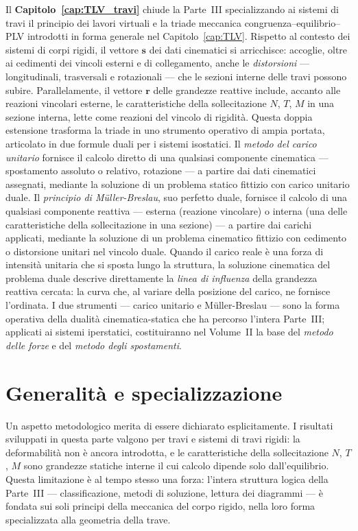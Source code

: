Il \textbf{Capitolo~\ref{cap:TLV_travi}} chiude la Parte~III specializzando ai
sistemi di travi il principio dei lavori virtuali e la triade meccanica
congruenza--equilibrio--PLV introdotti in forma generale nel
Capitolo~\ref{cap:TLV}. Rispetto al contesto dei sistemi di corpi rigidi,
il vettore $\bm{s}$ dei dati cinematici si arricchisce: accoglie, oltre ai
cedimenti dei vincoli esterni e di collegamento, anche le \emph{distorsioni}
--- longitudinali, trasversali e rotazionali --- che le sezioni interne delle
travi possono subire. Parallelamente, il vettore $\bm{r}$ delle grandezze
reattive include, accanto alle reazioni vincolari esterne, le caratteristiche
della sollecitazione $N$, $T$, $M$ in una sezione interna, lette come reazioni
del vincolo di rigidità. Questa doppia estensione trasforma la triade in uno
strumento operativo di ampia portata, articolato in due formule duali per i
sistemi isostatici. Il \emph{metodo del carico unitario} fornisce il calcolo
diretto di una qualsiasi componente cinematica --- spostamento assoluto o
relativo, rotazione --- a partire dai dati cinematici assegnati, mediante la
soluzione di un problema statico fittizio con carico unitario duale. Il
\emph{principio di Müller-Breslau}, suo perfetto duale, fornisce il calcolo
di una qualsiasi componente reattiva --- esterna (reazione vincolare) o
interna (una delle caratteristiche della sollecitazione in una sezione) ---
a partire dai carichi applicati, mediante la soluzione di un problema
cinematico fittizio con cedimento o distorsione unitari nel vincolo duale.
Quando il carico reale è una forza di intensità unitaria che si sposta lungo
la struttura, la soluzione cinematica del problema duale descrive direttamente
la \emph{linea di influenza} della grandezza reattiva cercata: la curva che,
al variare della posizione del carico, ne fornisce l'ordinata. I due
strumenti --- carico unitario e Müller-Breslau --- sono la forma operativa
della dualità cinematica-statica che ha percorso l'intera Parte~III;
applicati ai sistemi iperstatici, costituiranno nel Volume~II la base del
\emph{metodo delle forze} e del \emph{metodo degli spostamenti}.

\section*{Generalità e specializzazione}

Un aspetto metodologico merita di essere dichiarato esplicitamente. I risultati
sviluppati in questa parte valgono per travi e sistemi di travi rigidi: la
deformabilità non è ancora introdotta, e le caratteristiche della sollecitazione
$N$, $T$, $M$ sono grandezze statiche interne il cui calcolo dipende solo
dall'equilibrio. Questa limitazione è al tempo stesso una forza: l'intera struttura
logica della Parte~III --- classificazione, metodi di soluzione, lettura dei
diagrammi --- è fondata sui soli principi della meccanica del corpo rigido, nella
loro forma specializzata alla geometria della trave.

